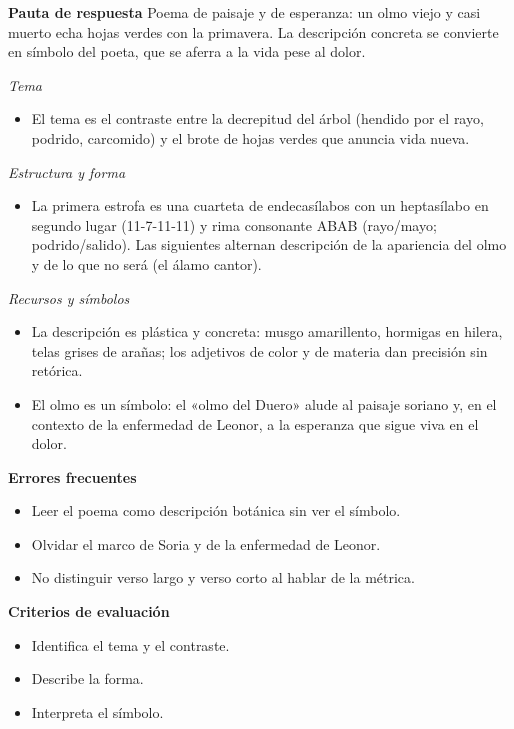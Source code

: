 \documentclass{book}
\begin{document}
\begin{tcolorbox}[title={Ejercicio resuelto}, studiumworked, breakable]
\noindent\textbf{Pauta de respuesta}
Poema de paisaje y de esperanza: un olmo viejo y casi muerto echa hojas verdes con la primavera. La descripción concreta se convierte en símbolo del poeta, que se aferra a la vida pese al dolor.


\noindent\textit{Tema}
\begin{itemize}
\item El tema es el contraste entre la decrepitud del árbol (hendido por el rayo, podrido, carcomido) y el brote de hojas verdes que anuncia vida nueva.
\end{itemize}

\noindent\textit{Estructura y forma}
\begin{itemize}
\item La primera estrofa es una cuarteta de endecasílabos con un heptasílabo en segundo lugar (11-7-11-11) y rima consonante ABAB (rayo/mayo; podrido/salido). Las siguientes alternan descripción de la apariencia del olmo y de lo que no será (el álamo cantor).
\end{itemize}

\noindent\textit{Recursos y símbolos}
\begin{itemize}
\item La descripción es plástica y concreta: musgo amarillento, hormigas en hilera, telas grises de arañas; los adjetivos de color y de materia dan precisión sin retórica.
\item El olmo es un símbolo: el «olmo del Duero» alude al paisaje soriano y, en el contexto de la enfermedad de Leonor, a la esperanza que sigue viva en el dolor.
\end{itemize}

\noindent\textbf{Errores frecuentes}
\begin{itemize}
\item Leer el poema como descripción botánica sin ver el símbolo.
\item Olvidar el marco de Soria y de la enfermedad de Leonor.
\item No distinguir verso largo y verso corto al hablar de la métrica.
\end{itemize}

\noindent\textbf{Criterios de evaluación}
\begin{itemize}
\item Identifica el tema y el contraste.
\item Describe la forma.
\item Interpreta el símbolo.
\end{itemize}
\end{tcolorbox}
\end{document}
